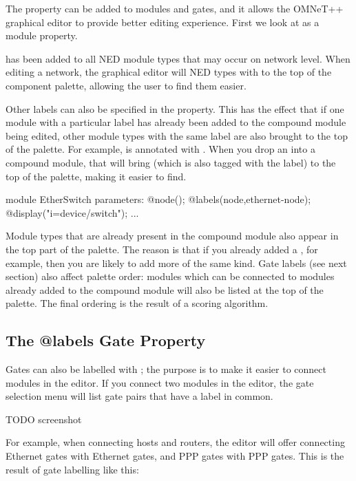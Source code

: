 The  property can be added to modules and gates, and it
allows the OMNeT++ graphical editor to provide better editing experience.
First we look at  as a module property.

 has been added to all NED module types that may occur on
network level. When editing a network, the graphical editor will NED types
with  to the top of the component palette, allowing the
user to find them easier.

Other labels can also be specified in the  property. This
has the effect that if one module with a particular label has already been
added to the compound module being edited, other module types with the same
label are also brought to the top of the palette. For example,
 is annotated with .
When you drop an  into a compound module, that will
bring  (which is also tagged with the
 label) to the top of the palette, making it easier to
find.

\begin{ned}
module EtherSwitch
{
    parameters:
        @node();
        @labels(node,ethernet-node);
        @display("i=device/switch");
    ...
}
\end{ned}

Module types that are already present in the compound module also appear in
the top part of the palette. The reason is that if you already added a
, for example, then you are likely to add more of the
same kind. Gate labels (see next section) also affect palette order: modules
which can be connected to modules already added to the compound module
will also be listed at the top of the palette. The final ordering is the
result of a scoring algorithm.


\subsection{The @labels Gate Property}

Gates can also be labelled with ; the purpose is to make it easier
to connect modules in the editor. If you connect two modules in the editor,
the gate selection menu will list gate pairs that have a label in common.

\ifdraft TODO
screenshot
\fi

For example, when connecting hosts and routers, the editor will offer connecting
Ethernet gates with Ethernet gates, and PPP gates with PPP gates. This is the
result of gate labelling like this:


